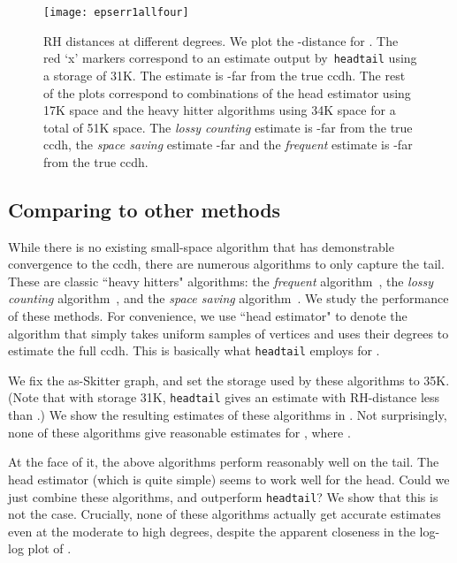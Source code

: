 \documentclass[11pt]{article}
\theoremstyle{definition}
\newcommand{\degdist}{{\tt headtail}}
\begin{document}
\begin{figure}
\centering \texttt{[image: epserr1allfour]}
\captionsetup{width=0.9\textwidth}
\caption{RH distances at different degrees.  We plot the -distance for
.  The red `\textsf{x}' markers correspond to an estimate output
by~\degdist{} using a storage of 31K.  The estimate is -far from
the true ccdh.  The rest of the plots correspond to combinations of the head
estimator using 17K space and the heavy hitter algorithms using 34K space for a
total of 51K space.  The \emph{lossy counting} estimate is -far from
the true ccdh, the \emph{space saving} estimate -far and the
\emph{frequent} estimate is -far from the true ccdh.}
\label{fig:allscales}
\end{figure}



\subsection{Comparing to other methods}\label{sec:compare}

While there is no existing small-space algorithm that has demonstrable convergence
to the ccdh, there are numerous algorithms to only capture the tail.
These are classic ``heavy hitters" algorithms: the \emph{frequent} algorithm~\cite{demaine2002frequency,
  karp2003simple,BerindeICS10}, the \emph{lossy counting}
algorithm~\cite{manku2002approximate}, and the \emph{space saving}
algorithm~\cite{metwally2005efficient}. We study the performance of these methods.
For convenience, we use ``head estimator" to denote the algorithm that simply
takes uniform samples of vertices and uses their degrees to estimate the full ccdh.
This is basically what \degdist{} employs for .


We fix the as-Skitter graph, and set the storage used by these algorithms to 35K. (Note that with storage 31K, \degdist{} gives an estimate
with RH-distance less than .) We show the resulting estimates of these algorithms
in . Not surprisingly, none of these algorithms give reasonable estimates
for , where .

At the face of it, the above algorithms perform reasonably well on the tail. The head estimator
(which is quite simple) seems to work well for the head. Could we just combine these algorithms,
and outperform \degdist? We show that this is not the case. Crucially,
none of these algorithms actually get accurate estimates even
at the moderate to high degrees, despite the apparent closeness in the log-log plot of .
\end{document}
